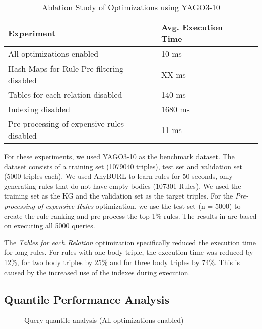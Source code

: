 \documentclass[english]{lni}
\begin{document}
\begin{table}[t]
\centering
\begin{tabular}{lll}
\toprule
Experiment & Avg. Execution Time \\
\midrule
All optimizations enabled & 10 ms\\
\midrule
Hash Maps for Rule Pre-filtering disabled & XX ms\\
Tables for each relation disabled & 140 ms\\
Indexing disabled & 1680 ms\\
Pre-processing of expensive rules disabled & 11 ms\\

\bottomrule
\end{tabular}
\caption{Ablation Study of Optimizations using YAGO3-10}
\label{tab:ablation}
\end{table}

For these experiments, we used YAGO3-10 as the benchmark dataset.\cite{YAGO3} The dataset consists of a training set (1079040 triples), test set and validation set (5000 triples each). We used AnyBURL to learn rules for 50 seconds, only generating rules that do not have empty bodies (107301 Rules). We used the training set as the KG and the validation set as the target triples. For the \textit{Pre-processing of expensive Rules} optimization, we use the test set (n = 5000) to create the rule ranking and pre-process the top 1\% rules. The results in  are based on executing all 5000 queries.

The \textit{Tables for each Relation} optimization specifically reduced the execution time for long rules. For rules with one body triple, the execution time was reduced by 12\%, for two body triples by 25\% and for three body triples by 74\%. This is caused by the increased use of the indexes during execution.

\subsection{Quantile Performance Analysis} 

\begin{figure}[t]
\caption{Query quantile analysis (All optimizations enabled)}
\end{figure}
\end{document}
